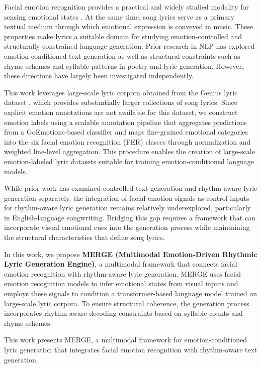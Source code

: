 \documentclass[11pt]{article}
\begin{document}
Facial emotion recognition provides a practical and widely studied 
modality for sensing emotional states \cite{goodfellow2013challenges, li2017reliable}.
 At the same time, song lyrics serve as a primary textual medium through which 
 emotional expression is conveyed in music. These properties make lyrics a 
 suitable domain for studying emotion-controlled and structurally constrained 
 language generation. Prior research in NLP has explored emotion-conditioned 
 text generation as well as structural constraints such as rhyme schemes and 
 syllable patterns in poetry and lyric generation. However, these directions 
 have largely been investigated independently.

This work leverages large-scale lyric corpora 
obtained from the Genius lyric dataset \cite{lim2021expertise}, which 
provides substantially larger collections of song lyrics. Since explicit 
emotion annotations are not available for this dataset, we construct 
emotion labels using a scalable annotation pipeline that aggregates 
predictions from a GoEmotions-based classifier and maps fine-grained 
emotional categories into the six facial emotion recognition (FER) classes 
through normalization and weighted line-level aggregation. This procedure 
enables the creation of large-scale emotion-labeled lyric datasets suitable 
for training emotion-conditioned language models.

While prior work has examined controlled text generation and rhythm-aware 
lyric generation separately, the integration of facial emotion signals as 
control inputs for rhythm-aware lyric generation remains relatively 
underexplored, particularly in English-language songwriting. Bridging 
this gap requires a framework that can incorporate visual emotional 
cues into the generation process while maintaining the structural 
characteristics that define song lyrics.

In this work, we propose 
\textbf{MERGE (Multimodal Emotion-Driven Rhythmic Lyric Generation Engine)}, 
a multimodal framework that connects facial emotion recognition with 
rhythm-aware lyric generation. MERGE uses facial emotion recognition 
models to infer emotional states from visual inputs and employs these 
signals to condition a transformer-based language model trained on 
large-scale lyric corpora. To ensure structural coherence, 
the generation process incorporates rhythm-aware decoding constraints
 based on syllable counts and rhyme schemes.

This work presents MERGE, a multimodal framework for emotion-conditioned 
lyric generation that integrates facial emotion recognition with rhythm-aware 
text generation.
\end{document}
